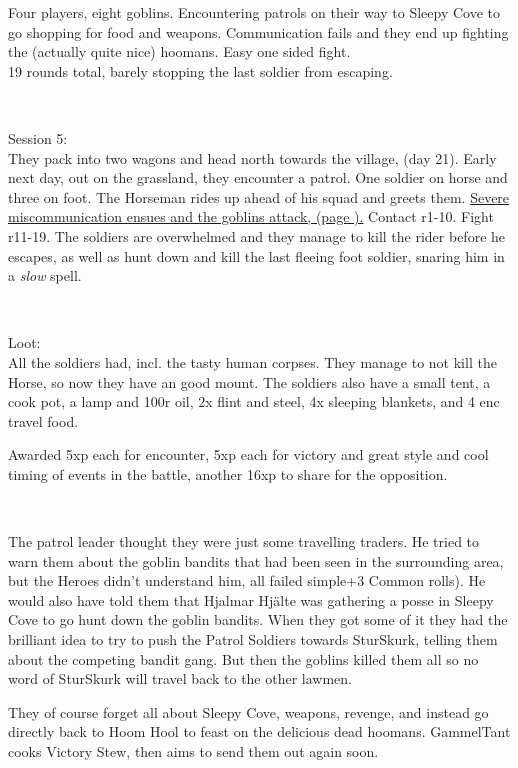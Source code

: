 Four players, eight goblins. Encountering patrols on their way to Sleepy Cove to go shopping for food and weapons. Communication fails and they end up fighting the (actually quite nice) hoomans. Easy one sided fight.\\
19 rounds total, barely stopping the last soldier from escaping.

\

Session 5:\\                                                            %
They pack into two wagons and head north towards the village, (day 21). Early next day, out on the grassland, they encounter a patrol. One soldier on horse and three on foot. The Horseman rides up ahead of his squad and greets them. \hyperref[misunderstandings]{Severe miscommunication ensues and the goblins attack, (page \pageref{misunderstandings}).} Contact r1-10. Fight r11-19. The soldiers are overwhelmed and they manage to kill the rider before he escapes, as well as hunt down and kill the last fleeing foot soldier, snaring him in a \emph{slow} spell.

\

Loot:\\
All the soldiers had, incl. the tasty human corpses. They manage to not kill the Horse, so now they have an good mount. The soldiers also have a small tent, a cook pot, a lamp and 100r oil, 2x flint and steel, 4x sleeping blankets, and 4 enc travel food.

Awarded 5xp each for encounter, 5xp each for victory and great style and cool timing of events in the battle, another 16xp to share for the opposition.

\

The patrol leader thought they were just some travelling traders. He tried to warn them about the goblin bandits that had been seen in the surrounding area, but the Heroes didn't understand him, all failed simple+3 Common rolls). He would also have told them that Hjalmar Hjälte was gathering a posse in Sleepy Cove to go hunt down the goblin bandits. When they got some of it they had the brilliant idea to try to push the Patrol Soldiers towards SturSkurk, telling them about the competing bandit gang. But then the goblins killed them all so no word of SturSkurk will travel back to the other lawmen.

They of course forget all about Sleepy Cove, weapons, revenge, and instead go directly back to Hoom Hool to feast on the delicious dead hoomans. GammelTant cooks Victory Stew, then aims to send them out again soon.

